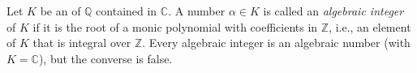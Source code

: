 \documentclass[12pt]{article}
\begin{document}
Let $K$ be an  of $\mathbb{Q}$ contained in $\mathbb{C}$.  A number $\alpha \in K$ is called an \emph{algebraic integer} of $K$ if it is the root of a monic polynomial with coefficients in $\mathbb{Z}$, i.e., an element of $K$ that is integral over $\mathbb{Z}$. Every algebraic integer is an algebraic number (with $K = \mathbb{C}$), but the converse is false.
\end{document}
